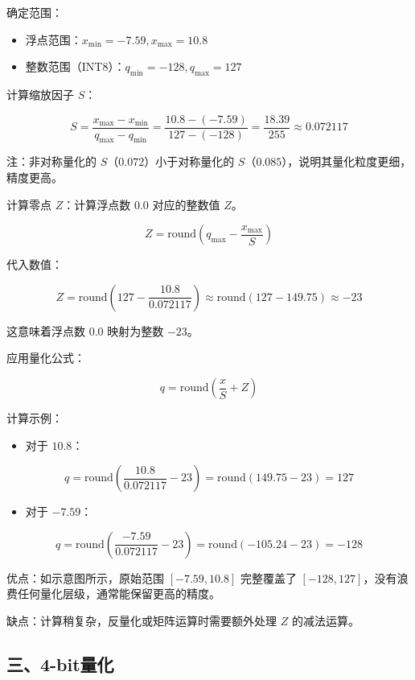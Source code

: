 确定范围：

\begin{itemize}
\tightlist
\item
  浮点范围：\(x_{\min} = -7.59, x_{\max} = 10.8\)
\item
  整数范围（INT8）：\(q_{\min} = -128, q_{\max} = 127\)
\end{itemize}

计算缩放因子 \(S\)：

\[
S = \frac{x_{\max} - x_{\min}}{q_{\max} - q_{\min}}
  = \frac{10.8 - (-7.59)}{127 - (-128)}
  = \frac{18.39}{255}
  \approx 0.072117
\]

注：非对称量化的 \(S\)（\(0.072\)）小于对称量化的 \(S\)（\(0.085\)），说明其量化粒度更细，精度更高。

计算零点 \(Z\)：计算浮点数 \(0.0\) 对应的整数值 \(Z\)。

\[
Z = \mathrm{round}\left(q_{\max} - \frac{x_{\max}}{S}\right)
\]

代入数值：

\[
Z = \mathrm{round}\left(127 - \frac{10.8}{0.072117}\right)
  \approx \mathrm{round}(127 - 149.75)
  \approx -23
\]

这意味着浮点数 \(0.0\) 映射为整数 \(-23\)。

应用量化公式：

\[
q = \mathrm{round}\left(\frac{x}{S} + Z\right)
\]

计算示例：

\begin{itemize}
\tightlist
\item
  对于 \(10.8\)：
\end{itemize}

\[
q = \mathrm{round}\left(\frac{10.8}{0.072117} - 23\right)
  = \mathrm{round}(149.75 - 23)
  = 127
\]

\begin{itemize}
\tightlist
\item
  对于 \(-7.59\)：
\end{itemize}

\[
q = \mathrm{round}\left(\frac{-7.59}{0.072117} - 23\right)
  = \mathrm{round}(-105.24 - 23)
  = -128
\]

优点：如示意图所示，原始范围 \([-7.59, 10.8]\) 完整覆盖了 \([-128, 127]\)，没有浪费任何量化层级，通常能保留更高的精度。

缺点：计算稍复杂，反量化或矩阵运算时需要额外处理 \(Z\) 的减法运算。

\hypertarget{ux4e094-bitux91cfux5316}{%
\subsection{三、4-bit量化}\label{ux4e094-bitux91cfux5316}}


